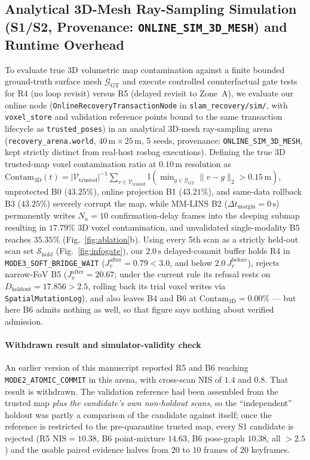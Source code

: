 \documentclass[journal]{IEEEtran}
\begin{document}
\subsection{Analytical 3D-Mesh Ray-Sampling Simulation (S1/S2, Provenance: \texorpdfstring{\texttt{ONLINE\_SIM\_3D\_MESH}}{ONLINE\_SIM\_3D\_MESH}) and Runtime Overhead}
To evaluate true 3D volumetric map contamination against a finite bounded ground-truth surface mesh $\mathcal{G}_{\mathrm{GT}}$ and execute controlled counterfactual gate tests for R4 (no loop revisit) versus R5 (delayed revisit to Zone~A), we evaluate our online node (\texttt{OnlineRecoveryTransactionNode} in \texttt{slam\_recovery/sim/}, with \texttt{voxel\_store} and validation reference points bound to the same transaction lifecycle as \texttt{trusted\_poses}) in an analytical 3D-mesh ray-sampling arena (\texttt{recovery\_arena.world}, $40\,\mathrm{m}\times 25\,\mathrm{m}$, 5 seeds, provenance: \texttt{ONLINE\_SIM\_3D\_MESH}, kept strictly distinct from real-host rosbag executions). Defining the true 3D trusted-map voxel contamination ratio at $0.10\,\mathrm{m}$ resolution as $\mathrm{Contam}_{3\mathrm{D}}(t) = |\mathcal{V}_{\mathrm{trusted}}|^{-1}\sum_{v\in\mathcal{V}_{\mathrm{trusted}}} \mathbb{I}(\min_{g\in\mathcal{G}_{\mathrm{GT}}}\|v-g\|_2 > 0.15\,\mathrm{m})$, unprotected B0 ($43.25\%$), online projection B1 ($43.21\%$), and same-data rollback B3 ($43.25\%$) severely corrupt the map, while MM-LINS B2 ($\Delta t_{\mathrm{margin}}=0\,\mathrm{s}$) permanently writes $N_\kappa=10$ confirmation-delay frames into the sleeping submap resulting in $17.79\%$ 3D voxel contamination, and unvalidated single-modality B5 reaches $35.35\%$ (Fig.~\ref{fig:ablation}b). Using every 5th scan as a strictly held-out scan set $\mathcal{S}_{\mathrm{hold}}$ (Fig.~\ref{fig:infogate}), our $2.0\,\mathrm{s}$ delayed-commit buffer holds R4 in \texttt{MODE3\_SOFT\_BRIDGE\_WAIT} ($J_v^{\mathrm{after}}=0.79<3.0$, and below $2.0\,J_v^{\mathrm{before}}$), rejects narrow-FoV B5 ($J_v^{\mathrm{after}}=20.67$; under the current rule its refusal rests on $D_{\mathrm{holdout}}=17.856>2.5$, rolling back its trial voxel writes via \texttt{SpatialMutationLog}), and also leaves B4 and B6 at $\mathrm{Contam}_{3\mathrm{D}} = 0.00\%$ --- but here B6 admits nothing as well, so that figure says nothing about verified admission.

\paragraph{Withdrawn result and simulator-validity check}
An earlier version of this manuscript reported R5 and B6 reaching \texttt{MODE2\_ATOMIC\_COMMIT} in this arena, with cross-scan NIS of $1.4$ and $0.8$. That result is withdrawn. The validation reference had been assembled from the trusted map \emph{plus the candidate's own non-holdout scans}, so the ``independent'' holdout was partly a comparison of the candidate against itself; once the reference is restricted to the pre-quarantine trusted map, every S1 candidate is rejected (R5 $\mathrm{NIS}=10.38$, B6 point-mixture $14.63$, B6 pose-graph $10.38$, all $>2.5$) and the usable paired evidence halves from $20$ to $10$ frames of $20$ keyframes.
\end{document}
